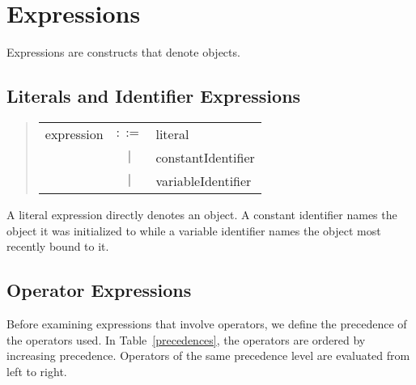 \section{Expressions}
\label{expressions}
Expressions are \emd{} constructs that denote objects.

\subsection{Literals and Identifier Expressions}
\begin{quote}\it\begin{tabular}{lcl}
expression &$::=$& literal \\
    & $|$ & constantIdentifier \\
    & $|$ & variableIdentifier
\end{tabular}\end{quote}
A literal expression directly denotes an object.
A constant identifier names the object it was initialized to while a variable
identifier names the object most recently bound to it. 

\subsection{Operator Expressions}
Before examining \emd{} expressions that involve operators, we define the
precedence of the operators used. In Table~\ref{precedences},
the operators are ordered by increasing
precedence.  Operators of the same 
precedence level are evaluated from left to right.

